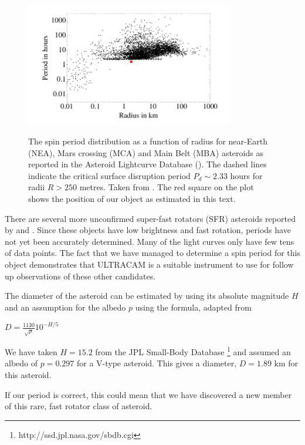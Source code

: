   \begin{figure}
    \center
    \includegraphics[width=90mm]{images/jacobson-asteroid-rotation-dot.png} 
    \label{fig:2005-05-10-run012}
    \caption{The spin period distribution as a function of radius for near-Earth (NEA), Mars crossing (MCA) and Main Belt (MBA) asteroids as reported in the Asteroid Lightcurve Database (\cite{2009Icar..202..134W}). The dashed lines indicate the critical surface disruption period $P_d \sim 2.33$ hours for radii $R > 250$ metres. Taken from \cite{Jacobson2014}. The red square on the plot shows the position of our object as estimated in this text.}
  \end{figure}
  

There are several more unconfirmed super-fast rotators (SFR) asteroids reported by \citet{Masiero2009} and \citet{Dermawan2011}. Since these objects have low brightness and fast rotation, periods have not yet been accurately determined. Many of the light curves only have few tens of data points. The fact that we have managed to determine a spin period for this object demonstrates that ULTRACAM is a suitable instrument to use for follow up observations of these other candidates.  

The diameter of the asteroid can be estimated by using its absolute magnitude $H$ and an assumption for the albedo $p$ using the formula, adapted from \citet{Jewitt2013}

$D = \frac{1130}{\sqrt{p}}10^{-H/5} $

We have taken $H = 15.2$ from the JPL Small-Body Database \footnote{http://ssd.jpl.nasa.gov/sbdb.cgi} and assumed an albedo of $ p = 0.297$ for a V-type asteroid. This gives a diameter, $D = 1.89$ km for this asteroid. 

If our period is correct, this could mean that we have discovered a new member of this rare, fast rotator class of asteroid. 

\newpage

